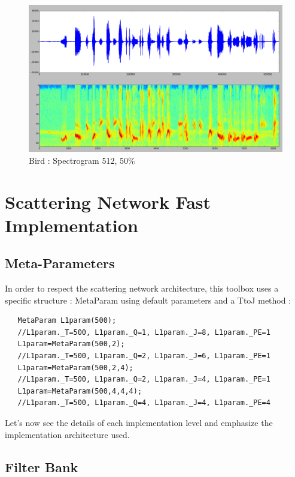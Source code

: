 \documentclass[a4paper]{report}
\begin{document}
\begin{figure}[H]
\begin{center}
\includegraphics[scale=0.21]{fftbird.png}\caption{Bird : Spectrogram 512, 50\% }
\end{center}
\end{figure}


\chapter{Scattering Network Fast Implementation}
\section{Meta-Parameters}
In order to respect the scattering network architecture, this toolbox uses a specific structure : MetaParam using default parameters and a TtoJ method :

\begin{lstlisting}
   MetaParam L1param(500);
   //L1param._T=500, L1param._Q=1, L1param._J=8, L1param._PE=1
   L1param=MetaParam(500,2);
   //L1param._T=500, L1param._Q=2, L1param._J=6, L1param._PE=1
   L1param=MetaParam(500,2,4);
   //L1param._T=500, L1param._Q=2, L1param._J=4, L1param._PE=1
   L1param=MetaParam(500,4,4,4);
   //L1param._T=500, L1param._Q=4, L1param._J=4, L1param._PE=4
\end{lstlisting}

Let's now see the details of each implementation level and emphasize the implementation architecture used.
\section{Filter Bank}
\end{document}

